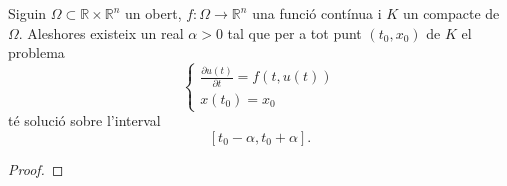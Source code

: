 \documentclass[../Apunts.tex]{subfiles}
\begin{document}
	\begin{corollary}
		Siguin \(\Omega\subset\mathbb{R}\times\mathbb{R}^{n}\) un obert, \(f\colon\Omega\longrightarrow\mathbb{R}^{n}\) una funció contínua i \(K\) un compacte de \(\Omega\). Aleshores existeix un real \(\alpha>0\) tal que per a tot punt \((t_{0},x_{0})\) de \(K\) el problema
		\[\begin{cases*}
			\displaystyle \frac{\partial u(t)}{\partial t}=f(t,u(t)) \\
			\displaystyle x(t_{0})=x_{0}
		\end{cases*}\]
		té solució sobre l'interval
		\[\left[t_{0}-\alpha,t_{0}+\alpha\right].\]
		\begin{proof}
		\end{proof}
	\end{corollary}
	
	
\end{document}
